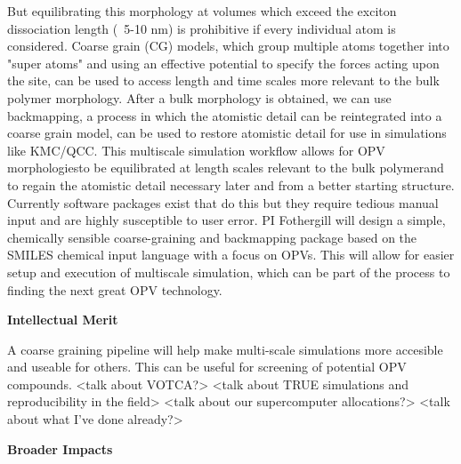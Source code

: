 But equilibrating this morphology at volumes which exceed the exciton dissociation length (~5-10 nm) is prohibitive if every individual atom is considered.
Coarse grain (CG) models, which group multiple atoms together into "super atoms" and using an effective potential to specify the forces acting upon the site, can be used to access length and time scales more relevant to the bulk polymer morphology.
After a bulk morphology is obtained, we can use backmapping, a process in which the atomistic detail can be reintegrated into a coarse grain model, can be used to restore atomistic detail for use in simulations like KMC/QCC.
This multiscale simulation workflow allows for OPV morphologiesto be equilibrated at length scales relevant to the bulk polymerand to regain the atomistic detail necessary later and from a better starting structure.
Currently software packages exist that do this but they require tedious manual input and are highly susceptible to user error.
PI Fothergill will design a simple, chemically sensible coarse-graining and backmapping package based on the SMILES chemical input language with a focus on OPVs.
This will allow for easier setup and execution of multiscale simulation, which can be part of the process to finding the next great OPV technology.

\begin{center}
    \textbf{Intellectual Merit}
\end{center}

A coarse graining pipeline will help make multi-scale simulations more accesible and useable for others. 
This can be useful for screening of potential OPV compounds.
<talk about VOTCA?>
<talk about TRUE simulations and reproducibility in the field>
<talk about our supercomputer allocations?>
<talk about what I've done already?>

\begin{center}
    \textbf{Broader Impacts}
\end{center}

